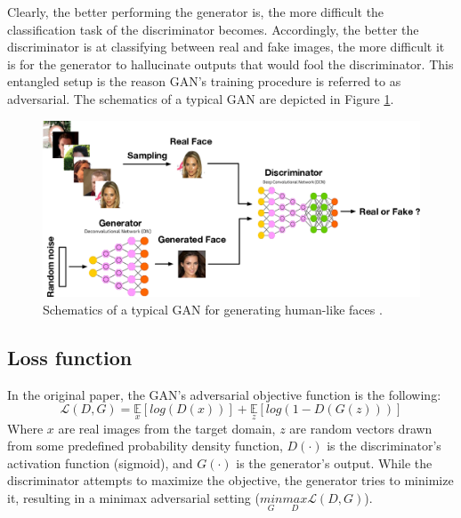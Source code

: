 Clearly, the better performing the generator is, the more difficult the classification task of the discriminator becomes.
Accordingly, the better the discriminator is at classifying between real and fake images, the more difficult it is for the generator to hallucinate outputs that would fool the discriminator.
This entangled setup is the reason GAN's training procedure is referred to as adversarial.
The schematics of a typical GAN are depicted in Figure \ref{fig:gan_arch}.
\begin{figure}[H]
    \centering
    \includegraphics[width=\linewidth]{../figs/related_work/gan_arch.png}
    \caption{Schematics of a typical GAN for generating human-like faces \cite{radhakrishna_2020}.}
    \label{fig:gan_arch}
\end{figure}

\subsection{Loss function}
In the original paper, the GAN's adversarial objective function is the following:
\begin{equation} \label{eq:origGanLoss}
    \mathcal{L}(D,G) = \underset{x}{\mathbb{E}}\left[log\left(D(x)\right)\right] + \underset{z}{\mathbb{E}}\left[log\left(1 - D\left(G(z)\right)\right)\right]
\end{equation}
Where $x$ are real images from the target domain, $z$ are random vectors drawn from some predefined probability density function, $D(\cdot)$ is the discriminator's activation function (sigmoid), and $G(\cdot)$ is the generator's output.
While the discriminator attempts to maximize the objective, the generator tries to minimize it, resulting in a minimax adversarial setting ($\underset{G}{min}\underset{D}{max} \mathcal{L}(D,G)$).

